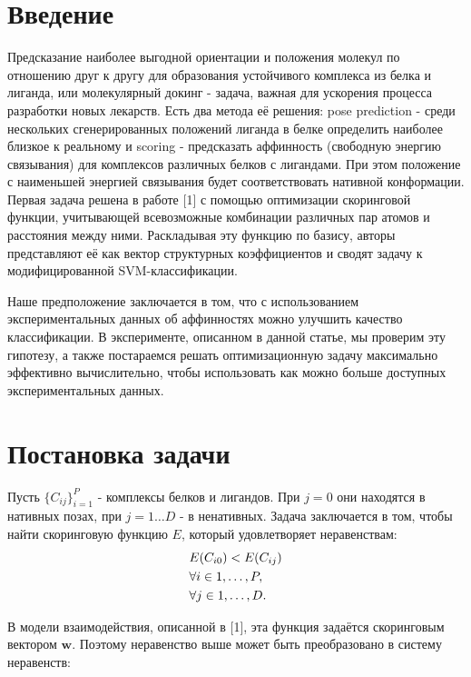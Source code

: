 \documentclass[12pt,twoside]{article}
\title
    {Формулировка и решение задачи оптимизации, сочетающей классификацию и регрессию, 
    для оценки энергии связывания белка и маленьких молекул}
\author
    {Анастасия Грачева, Мария Кадукова, Сергей Грудинин, В.В. Стрижов} %
\begin{document}
\maketitle
\section{Введение}
Предсказание наиболее выгодной ориентации и положения молекул по отношению друг к другу для образования устойчивого комплекса из белка и лиганда, или молекулярный докинг - задача, важная для ускорения процесса разработки новых лекарств.
Есть два метода её решения: pose prediction - среди нескольких сгенерированных положений лиганда в белке определить наиболее близкое к реальному и scoring - предсказать аффинность (свободную энергию связывания) для комплексов различных белков с лигандами. При этом положение с наименьшей энергией связывания будет соответствовать нативной конформации. Первая задача решена в работе [1] с помощью оптимизации скоринговой функции, учитывающей всевозможные комбинации различных пар атомов и расстояния между ними. Раскладывая эту функцию по базису, авторы представляют её как вектор структурных коэффициентов и сводят задачу к модифицированной SVM-классификации.

Наше предположение заключается в том, что с использованием экспериментальных данных об аффинностях можно улучшить качество классификации. В эксперименте, описанном в данной статье, мы проверим эту гипотезу, а также постараемся решать оптимизационную задачу максимально эффективно вычислительно, чтобы использовать как можно больше доступных экспериментальных  данных.

\section{Постановка задачи}
Пусть $\{C_{ij}\}_{i=1}^P$ - комплексы белков и лигандов. При $j=0$ они находятся в нативных позах, при $j = 1 \dots D$ - в ненативных. Задача заключается в том, чтобы найти скоринговую функцию $E$, который удовлетворяет неравенствам: 
\begin{equation}\\
\begin{split}
& E(C_{i0}) < E(C_{ij}) \\
& \forall i\in 1,\dots,P, \\
& \forall j\in 1,\dots,D.
\end{split}
\end{equation}

В модели взаимодействия, описанной в [1], эта функция задаётся скоринговым вектором $\mathbf{w}$. Поэтому неравенство выше может быть преобразовано в систему неравенств:
 
\end{document}
